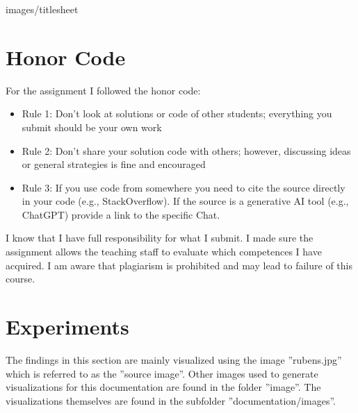 \documentclass[a4paper,twoside,12pt,DIV=13,BCOR=5mm,numbers=noenddot,cleardoublepage=empty]{scrbook}
\begin{document}
\renewcommand{\baselinestretch}{1.25}

\large

{images/titlesheet}     %

\cleardoublepage
\setcounter{tocdepth}{3}

\setcounter{page}{0}
\renewcommand{\thepage}{\roman{page}}
\tableofcontents \cleardoublepage

\setcounter{page}{1}
\renewcommand{\thepage}{\arabic{page}}
\setcounter{chapter}{0}

\chapter{Honor Code}
For the assignment I followed the honor code:
\begin{itemize}
    \item Rule 1: Don't look at solutions or code of other students; everything you submit should be your own work
    \item Rule 2: Don't share your solution code with others; however, discussing ideas or general strategies is fine and encouraged
    \item Rule 3: If you use code from somewhere you need to cite the source directly in your code (e.g., StackOverflow).
If the source is a generative AI tool (e.g., ChatGPT) provide a link to the specific Chat.
\end{itemize}

I know that I have full responsibility for what I submit. I made sure the assignment allows the teaching staff to evaluate which
competences I have acquired. I am aware that plagiarism is prohibited and may lead to failure of this course.

\chapter{Experiments}
The findings in this section are mainly visualized using the image ''rubens.jpg'' which is referred to as the ''source image''.
Other images used to generate visualizations for this documentation are found in the folder ''image''.
The visualizations themselves are found in the subfolder ''documentation/images''.
\end{document}
